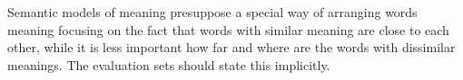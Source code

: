 \documentclass[11pt]{article}
\begin{document}


Semantic models of meaning presuppose a special way of arranging words meaning focusing on the fact that words with similar meaning are close to each other, while it is less important how far and where are the words with dissimilar meanings. The evaluation sets should state this implicitly.



% 


\balance
\end{document}
